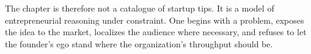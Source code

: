 The chapter is therefore not a catalogue of startup tips. It is a model of entrepreneurial reasoning under constraint. One begins with a problem, exposes the idea to the market, localizes the audience where necessary, and refuses to let the founder's ego stand where the organization's throughput should be.